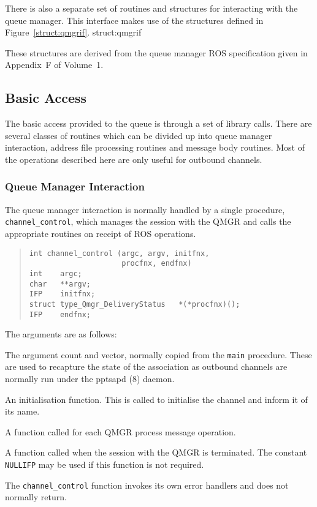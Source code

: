 There is also a separate set of routines and structures for
interacting with the queue manager. This interface makes use of the
structures defined in
Figure~\ref{struct:qmgrif}.
{struct:qmgrif}

These structures are derived from the queue manager ROS specification
given in Appendix~F of Volume~1.

\subsection {Basic Access}

The basic access provided to the queue is through a set of library
calls.  There are several classes of routines which can be divided up
into queue manager interaction, address file processing routines and
message body routines. Most of the operations described here are only
useful for outbound channels.

\subsubsection{Queue Manager Interaction}

The queue manager interaction is normally handled by a single
procedure, 
\linebreak
\verb|channel_control|, which manages the session with the
QMGR and calls the appropriate routines on receipt of ROS operations.

\begin{quote}\begin{verbatim}
int channel_control (argc, argv, initfnx, 
                     procfnx, endfnx)
int    argc;
char   **argv;
IFP    initfnx;
struct type_Qmgr_DeliveryStatus   *(*procfnx)();
IFP    endfnx;
\end{verbatim}\end{quote}

The arguments are as follows:
\begin{describe}
\item[\verb|argc|/\verb|argv|:]	The argument count and vector, normally
copied from the \verb|main| procedure. These are used to recapture the
state of the association as outbound channels are normally run under
the \man pptsapd (8) daemon.

\item[\verb|initfnx|:]	An initialisation function. This is called to
initialise the channel and inform it of its name.

\item[\verb|procfnx|:]	A function called for each QMGR process
message operation.

\item[\verb|endfnx|:] A function called when the session with the QMGR
is terminated. The constant \verb|NULLIFP| may be used if this function
is not required.
\end{describe}
The \verb|channel_control| function invokes its own error handlers
and does not normally return.



